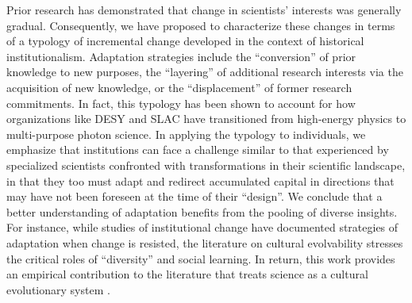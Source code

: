 \documentclass{article}
\begin{document}
Prior research has demonstrated that change in scientists' interests was generally gradual. Consequently, we have proposed to characterize these changes in terms of a typology of incremental change developed in the context of historical institutionalism. Adaptation strategies include the ``conversion'' of prior knowledge to new purposes, the ``layering'' of additional research interests via the acquisition of new knowledge, or the ``displacement'' of former research commitments. In fact, this typology has been shown to account for how organizations like DESY and SLAC have transitioned from high-energy physics to multi-purpose photon science. In applying the typology to individuals, we emphasize that institutions can face a challenge similar to that experienced by specialized scientists confronted with transformations in their scientific landscape, in that they too must adapt and redirect accumulated capital in directions that may have not been foreseen at the time of their ``design''. We conclude that a better understanding of adaptation benefits from the pooling of diverse insights. For instance, while studies of institutional change have documented strategies of adaptation when change is resisted, the literature on cultural evolvability stresses the critical roles of ``diversity'' and social learning. In return, this work provides an empirical contribution to the literature that treats science as a cultural evolutionary system \citep{Wu2023}.



\end{document}
